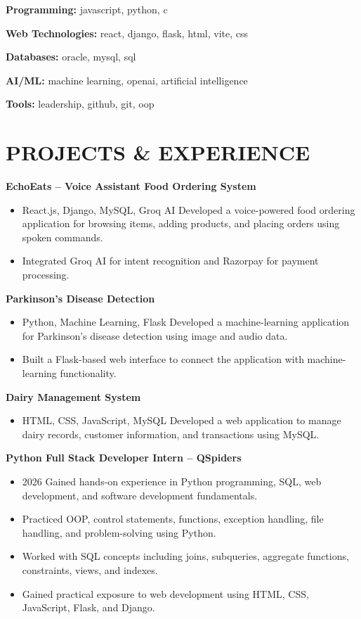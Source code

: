 \documentclass[9pt,a4paper]{extarticle}
\begin{document}
\textbf{Programming:} javascript, python, c

\textbf{Web Technologies:} react, django, flask, html, vite, css

\textbf{Databases:} oracle, mysql, sql

\textbf{AI/ML:} machine learning, openai, artificial intelligence

\textbf{Tools:} leadership, github, git, oop


\section*{PROJECTS \& EXPERIENCE}

\noindent \textbf{EchoEats – Voice Assistant Food Ordering System}
\begin{itemize}[leftmargin=*, parsep=0pt, itemsep=1pt, topsep=1pt]
    \item React.js, Django, MySQL, Groq AI Developed a voice-powered food ordering application for browsing items, adding products, and placing orders using spoken commands.
    \item Integrated Groq AI for intent recognition and Razorpay for payment processing.
\end{itemize}
\vspace{4pt}
\noindent \textbf{Parkinson’s Disease Detection}
\begin{itemize}[leftmargin=*, parsep=0pt, itemsep=1pt, topsep=1pt]
    \item Python, Machine Learning, Flask Developed a machine-learning application for Parkinson’s disease detection using image and audio data.
    \item Built a Flask-based web interface to connect the application with machine-learning functionality.
\end{itemize}
\vspace{4pt}
\noindent \textbf{Dairy Management System}
\begin{itemize}[leftmargin=*, parsep=0pt, itemsep=1pt, topsep=1pt]
    \item HTML, CSS, JavaScript, MySQL Developed a web application to manage dairy records, customer information, and transactions using MySQL.
\end{itemize}
\vspace{4pt}
\noindent \textbf{Python Full Stack Developer Intern – QSpiders}
\begin{itemize}[leftmargin=*, parsep=0pt, itemsep=1pt, topsep=1pt]
    \item 2026 Gained hands-on experience in Python programming, SQL, web development, and software development fundamentals.
    \item Practiced OOP, control statements, functions, exception handling, file handling, and problem-solving using Python.
    \item Worked with SQL concepts including joins, subqueries, aggregate functions, constraints, views, and indexes.
    \item Gained practical exposure to web development using HTML, CSS, JavaScript, Flask, and Django.
\end{itemize}
\end{document}
